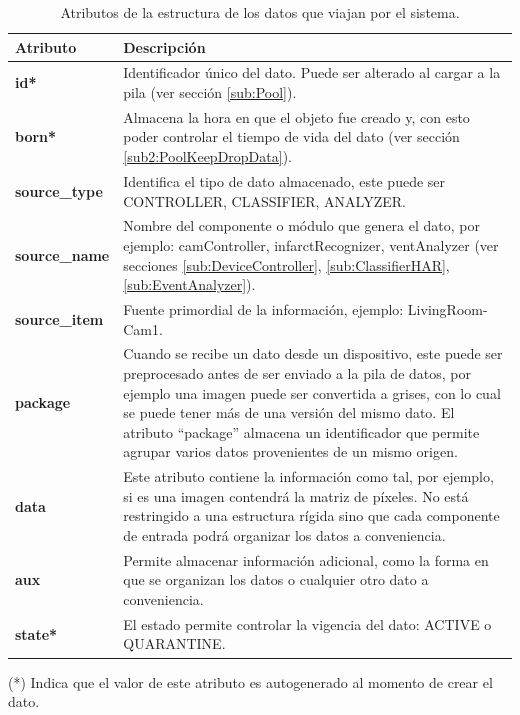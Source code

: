         \begin{table}[ht!]
        \caption[Atributos de datos a transmitir]{Atributos de la estructura de los datos que viajan por el sistema.}
        \label{Tab:DataEstructureAttr}
        \centering
        \begin{tabular}{ | l p{11cm} | } 
            \hline
             \textbf{Atributo}      & \textbf{Descripción} \\ 
            \hline\hline
            \textbf{id*}            & Identificador único del dato. Puede ser alterado al cargar a la pila (ver sección \ref{sub:Pool}). \\
            \hline
            \textbf{born*}          & Almacena la hora en que el objeto fue creado y, con esto poder controlar el tiempo de vida del dato (ver sección \ref{sub2:PoolKeepDropData}). \\
            \hline
            \textbf{source\_type}   & Identifica el tipo de dato almacenado, este puede ser CONTROLLER, CLASSIFIER, ANALYZER. \\
            \hline
            \textbf{source\_name}    & Nombre del componente o módulo que genera el dato, por ejemplo:  camController, infarctRecognizer, ventAnalyzer (ver secciones \ref{sub:DeviceController}, \ref{sub:ClassifierHAR}, \ref{sub:EventAnalyzer}). \\
            \hline
            \textbf{source\_item}   & Fuente primordial de la información, ejemplo: LivingRoom-Cam1. \\
            \hline
            \textbf{package}        & Cuando se recibe un dato desde un dispositivo, este puede ser preprocesado antes de ser enviado a la pila de datos, por ejemplo una imagen puede ser convertida a grises, con lo cual se puede tener más de una versión del mismo dato. El atributo ``package'' almacena un identificador que permite agrupar varios datos provenientes de un mismo origen. \\
            \hline
            \textbf{data}           & Este atributo contiene la información como tal, por ejemplo, si es una imagen contendrá la matriz de píxeles. No está restringido a una estructura rígida sino que cada componente de entrada podrá organizar los datos a conveniencia. \\
            \hline
            \textbf{aux}            & Permite almacenar información adicional, como la forma en que se organizan los datos o cualquier otro dato a conveniencia. \\
            \hline
            \textbf{state*}         & El estado permite controlar la vigencia del dato: ACTIVE o QUARANTINE. \\
            \hline
        \end{tabular}
        
        {(*) Indica que el valor de este atributo es autogenerado al momento de crear el dato.}
        \end{table}
        
